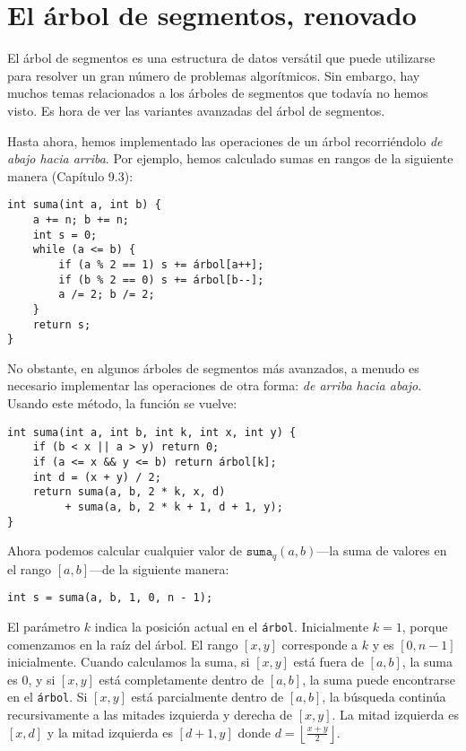 \chapter{El árbol de segmentos, renovado}


El árbol de segmentos es una estructura de datos versátil que puede
utilizarse para resolver un gran número de problemas algorítmicos. Sin
embargo, hay muchos temas relacionados a los árboles de segmentos que todavía
no hemos visto. Es hora de ver las variantes avanzadas del árbol de
segmentos.

Hasta ahora, hemos implementado las operaciones de un árbol recorriéndolo
\emph{de abajo hacia arriba}. Por ejemplo, hemos calculado sumas en rangos
de la siguiente manera (Capítulo 9.3):

\begin{lstlisting}
int suma(int a, int b) {
    a += n; b += n;
    int s = 0;
    while (a <= b) {
        if (a % 2 == 1) s += árbol[a++];
        if (b % 2 == 0) s += árbol[b--];
        a /= 2; b /= 2;
    }
    return s;
}
\end{lstlisting}

No obstante, en algunos árboles de segmentos más avanzados, a menudo es
necesario implementar las operaciones de otra forma: \emph{de arriba hacia
    abajo}. Usando este método, la función se vuelve:
\begin{lstlisting}
int suma(int a, int b, int k, int x, int y) {
    if (b < x || a > y) return 0;
    if (a <= x && y <= b) return árbol[k];
    int d = (x + y) / 2;
    return suma(a, b, 2 * k, x, d)
         + suma(a, b, 2 * k + 1, d + 1, y);
}
\end{lstlisting}

Ahora podemos calcular cualquier valor de $\texttt{suma}_q(a, b)$---la
suma de valores en el rango $[a,b]$---de la siguiente manera:
\begin{lstlisting}
int s = suma(a, b, 1, 0, n - 1);
\end{lstlisting}

El parámetro $k$ indica la posición actual en el \texttt{árbol}. Inicialmente
$k=1$, porque comenzamos en la raíz del árbol. El rango $[x,y]$ corresponde
a $k$ y es $[0,n-1]$ inicialmente. Cuando calculamos la suma, si $[x,y]$
está fuera de $[a,b]$, la suma es 0, y si $[x,y]$ está completamente dentro
de $[a,b]$, la suma puede encontrarse en el \texttt{árbol}. Si $[x,y]$ está
parcialmente dentro de $[a,b]$, la búsqueda continúa recursivamente a las
mitades izquierda y derecha de $[x,y]$. La mitad izquierda es $[x,d]$ y la
mitad izquierda es $[d+1,y]$ donde $d=\left\lfloor \frac{x+y}{2} \right\rfloor$.

